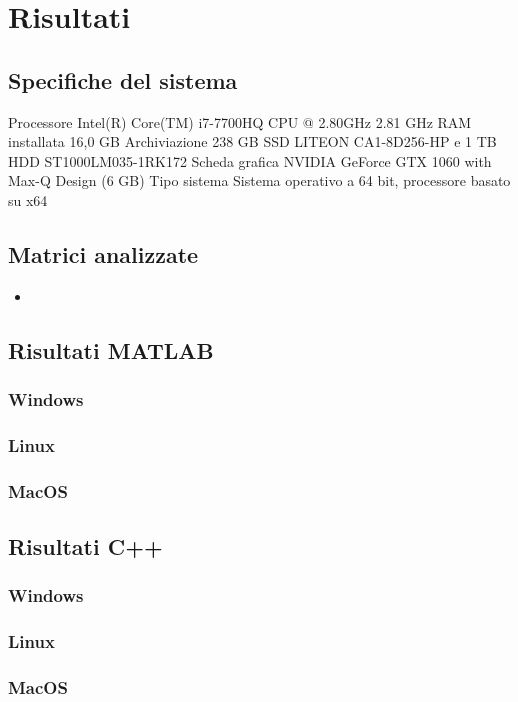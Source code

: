 \chapter{Risultati}

\section{Specifiche del sistema}

Processore	Intel(R) Core(TM) i7-7700HQ CPU @ 2.80GHz   2.81 GHz
RAM installata	16,0 GB
Archiviazione	238 GB SSD LITEON CA1-8D256-HP e 1 TB HDD ST1000LM035-1RK172
Scheda grafica	NVIDIA GeForce GTX 1060 with Max-Q Design (6 GB)
Tipo sistema	Sistema operativo a 64 bit, processore basato su x64

\section{Matrici analizzate}

\begin{itemize}
    \item 
\end{itemize}

\section{Risultati MATLAB}

\subsection{Windows}

\subsection{Linux}

\subsection{MacOS}

\section{Risultati C++}

\subsection{Windows}

\subsection{Linux}

\subsection{MacOS}